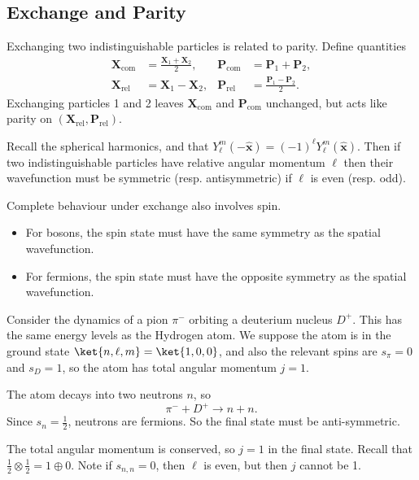 \documentclass[12pt]{article}
\begin{document}
\subsection{Exchange and Parity}
\label{sub:ex_par}

Exchanging two indistinguishable particles is related to parity. Define quantities
\begin{align*}
	\mathbf{X}_{\mathrm{com}} &= \frac{\mathbf{X}_1 + \mathbf{X}_2}{2}, & \mathbf{P}_{\mathrm{com}} &= \mathbf{P}_1 + \mathbf{P}_2, \\
	\mathbf{X}_{\mathrm{rel}} &= \mathbf{X}_1 - \mathbf{X}_2, & \mathbf{P}_{\mathrm{rel}} &= \frac{\mathbf{P}_1 - \mathbf{P}_2}{2}.
\end{align*}
Exchanging particles 1 and 2 leaves $\mathbf{X}_{\mathrm{com}}$ and $\mathbf{P}_{\mathrm{com}}$ unchanged, but acts like parity on $(\mathbf{X}_{\mathrm{rel}}, \mathbf{P}_{\mathrm{rel}})$.

Recall the spherical harmonics, and that $Y_\ell^m(- \mathbf{\hat x}) =  (-1)^{\ell }Y_\ell^m(\mathbf{\hat x})$. Then if two indistinguishable particles have relative angular momentum $\ell $ then their wavefunction must be symmetric (resp. antisymmetric) if $\ell$ is even (resp. odd).

Complete behaviour under exchange also involves spin.
\begin{itemize}
	\item For bosons, the spin state must have the same symmetry as the spatial wavefunction.
	\item For fermions, the spin state must have the opposite symmetry as the spatial wavefunction.
\end{itemize}
Consider the dynamics of a pion $\pi^{-}$ orbiting a deuterium nucleus $D^{+}$. This has the same energy levels as the Hydrogen atom. We suppose the atom is in the ground state $\ket{n, \ell,m} = \ket{1, 0,0}$, and also the relevant spins are $s_{\pi} = 0$ and $s_D = 1$, so the atom has total angular momentum $j = 1$.

The atom decays into two neutrons $n$, so
\[
\pi^{-} + D^{+} \to n + n.
\]
Since $s_n = \frac{1}{2}$, neutrons are fermions. So the final state must be anti-symmetric.

The total angular momentum is conserved, so $j= 1$ in the final state. Recall that $\frac{1}{2} \otimes \frac{1}{2} = 1 \oplus 0$. Note if $s_{n,n} = 0$, then $\ell$ is even, but then $j$ cannot be 1.

\end{document}
